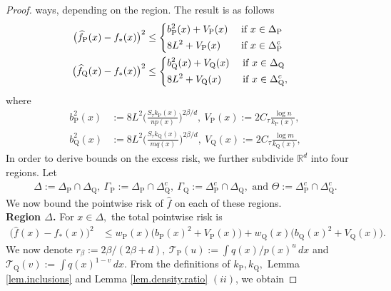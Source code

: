 \documentclass[10pt]{article}
\newcommand{\mT}{\mathcal{T}}
\newcommand{\RR}{\mathbb{R}}
\renewcommand{\P}{\operatorname{P}}
\newcommand{\Q}{\operatorname{Q}}
\newcommand{\wh}{\widehat}
\begin{document}
\begin{proof}
    ways, depending on the region. The result is as follows
    \begin{align}
        \label{eq.first.bv}
        \begin{split}
        \big(\wh f_{\P}(x) - f_*(x)\big)^2 &\leq \begin{dcases}
            b^2_{\P}(x) + V_{\P}(x) & \text{ if } x \in \Delta_{\P}\\
            8L^2 + V_{\P}(x) &\text{ if } x \in \Delta_{\P}^c
        \end{dcases}\\
        \big(\wh f_{\Q}(x) - f_*(x)\big)^2 &\leq \begin{dcases}
            b^2_{\Q}(x) + V_{\Q}(x) & \text{ if } x \in \Delta_{\Q}\\
            8L^2 + V_{\Q}(x) &\text{ if } x \in \Delta_{\Q}^c,
        \end{dcases}
        \end{split}
    \end{align}
    where
    \begin{align*}
        b_{\P}^2(x) &:= 8L^2\bigg(\frac{S_\tau k_{\P}(x)}{np(x)}\bigg)^{2\beta/d}, \ V_{\P}(x) := 2C_\tau \frac{\log n}{k_{\P}(x)},\\
        b_{\Q}^2(x) &:= 8L^2\bigg(\frac{S_\tau k_{\Q}(x)}{mq(x)}\bigg)^{2\beta/d}, \ V_{\Q}(x) := 2C_\tau \frac{\log m}{k_{\Q}(x)},
    \end{align*}
    In order to derive bounds on the excess risk, we further subdivide $\RR^d$ into four regions. Let 
    \begin{align*}
        \Delta := \Delta_{\P}\cap \Delta_{\Q}, \ \Gamma_{\P} := \Delta_{\P}\cap \Delta_{\Q}^c,\ \Gamma_{\Q} := \Delta_{\P}^c\cap \Delta_{\Q},\text{ and } \Theta := \Delta_{\P}^c\cap \Delta_{\Q}^c.
    \end{align*}
    We now bound the pointwise risk of $\wh f$ on each of these regions.\\
    \noindent\textbf{Region $\Delta$.} For $x \in \Delta,$ the total pointwise risk is
    \begin{align}
        \label{eq.pointwise.loss.bulk}
        \big(\wh f(x) - f_*(x)\big)^2 &\leq w_{\P}(x)\big(b_{\P}(x)
        ^2 + V_{\P}(x)\big) + w_{\Q}(x)\big(b_{\Q}(x)
        ^2 + V_{\Q}(x)\big).
    \end{align}
    We now denote $r_\beta := 2\beta/(2\beta + d), \ \mT_{\P}(u) := \int q(x)/p(x)^{u}\, dx$ and $\mT_{\Q}(v) := \int q(x)^{1 -v}\, dx.$ From the definitions of $k_{\P}, k_{\Q},$ Lemma \ref{lem.inclusions} and Lemma \ref{lem.density.ratio} $(ii)$, we obtain

\end{proof}
\end{document}
